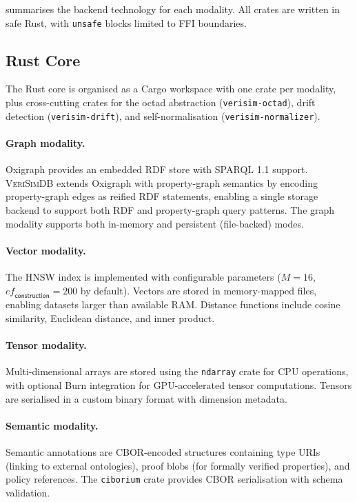 \documentclass[11pt,twocolumn]{article}
\newcommand{\verisimdb}{\textsc{VeriSimDB}\xspace}
\begin{document}
 summarises the backend technology for each modality.
All crates are written in safe Rust, with \texttt{unsafe} blocks limited
to FFI boundaries.

\subsection{Rust Core}

The Rust core is organised as a Cargo workspace with one crate per modality,
plus cross-cutting crates for the octad abstraction (\texttt{verisim-octad}),
drift detection (\texttt{verisim-drift}), and self-normalisation
(\texttt{verisim-normalizer}).

\paragraph{Graph modality.}
Oxigraph provides an embedded RDF store with SPARQL 1.1 support.
\verisimdb extends Oxigraph with property-graph semantics by encoding
property-graph edges as reified RDF statements, enabling a single storage
backend to support both RDF and property-graph query patterns.  The graph
modality supports both in-memory and persistent (file-backed) modes.

\paragraph{Vector modality.}
The HNSW index is implemented with configurable parameters
($M = 16$, $\mathit{ef}_\mathsf{construction} = 200$ by default).
Vectors are stored in memory-mapped files, enabling datasets larger than
available RAM.  Distance functions include cosine similarity, Euclidean
distance, and inner product.

\paragraph{Tensor modality.}
Multi-dimensional arrays are stored using the \texttt{ndarray} crate for
CPU operations, with optional Burn integration for GPU-accelerated tensor
computations.  Tensors are serialised in a custom binary format with
dimension metadata.

\paragraph{Semantic modality.}
Semantic annotations are CBOR-encoded structures containing type URIs
(linking to external ontologies), proof blobs (for formally verified
properties), and policy references.  The \texttt{ciborium} crate provides
CBOR serialisation with schema validation.
\end{document}

